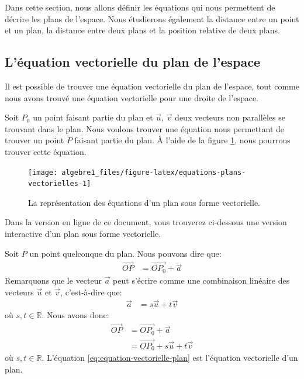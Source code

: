 \documentclass[]{book}
\theoremstyle{definition}
\theoremstyle{definition}
\theoremstyle{definition}
\theoremstyle{remark}
\begin{document}
Dans cette section, nous allons définir les équations qui nous permettent de décrire les plans de l'espace. Nous étudierons également la distance entre un point et un plan, la distance entre deux plans et la position relative de deux plans.

\hypertarget{luxe9quation-vectorielle-du-plan-de-lespace}{%
\subsection{L'équation vectorielle du plan de l'espace}\label{luxe9quation-vectorielle-du-plan-de-lespace}}

Il est possible de trouver une équation vectorielle du plan de l'espace, tout comme nous avons trouvé une équation vectorielle pour une droite de l'espace.

Soit \(P_0\) un point faisant partie du plan et \(\vec u\), \(\vec v\) deux vecteurs non parallèles se trouvant dans le plan. Nous voulons trouver une équation nous permettant de trouver un point \(P\) faisant partie du plan. À l'aide de la figure \ref{fig:equations-plans-vectorielles}, nous pourrons trouver cette équation.

\begin{figure}

{\centering \texttt{[image: algebre1\_files/figure-latex/equations-plans-vectorielles-1]} 

}

\caption{La représentation des équations d'un plan sous forme vectorielle.}\label{fig:equations-plans-vectorielles}
\end{figure}

Dans la version en ligne de ce document, vous trouverez ci-dessous une version interactive d'un plan sous forme vectorielle.

Soit \(P\) un point quelconque du plan. Nous pouvons dire que:
\begin{align*}
\overrightarrow{OP} &= \overrightarrow{OP_0} + \vec a
\end{align*}
Remarquons que le vecteur \(\vec a\) peut s'écrire comme une combinaison linéaire des vecteurs \(\vec u\) et \(\vec v\), c'est-à-dire que:
\begin{align*}
\vec a &= s\vec u + t \vec v
\end{align*}
où \(s,t\in\mathbb{R}\). Nous avons donc:
\begin{align}
\overrightarrow{OP} &= \overrightarrow{OP_0} + \vec a \\
&= \overrightarrow{OP_0} + s\vec u + t \vec v
\label{eq:equation-vectorielle-plan}
\end{align}
où \(s,t\in\mathbb{R}\). L'équation \eqref{eq:equation-vectorielle-plan} est l'équation vectorielle d'un plan.
\end{document}

